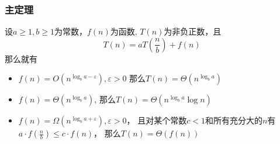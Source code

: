 \documentclass[./../main.tex]{subfiles} %
\begin{document}
\subsubsection{主定理}
\begin{theorem}
    设$a\ge1,b\ge1$为常数，$f(n)$为函数, $T(n)$为非负正数，且
    $$
    T(n)=aT(\frac{n}{b})+f(n)
    $$
    那么就有
    \begin{itemize}
        \item $f(n)=O(n^{\log_ba-\varepsilon}), \varepsilon>0$
        那么$T(n)=\Theta(n^{\log_ba})$
        \item $f(n)=\Theta(n^{\log_ba})$,
        那么$T(n)=\Theta(n^{\log_ba}\log n)$
        \item $f(n)=\Omega(n^{\log_ba+\varepsilon}), \varepsilon>0$，
        且对某个常数$c<1$和所有充分大的$n$有$a\cdot f(\frac{n}{b})\le c\cdot f(n)$，
        那么$T(n)=\Theta(f(n))$
    \end{itemize}
\end{theorem}
\end{document}
